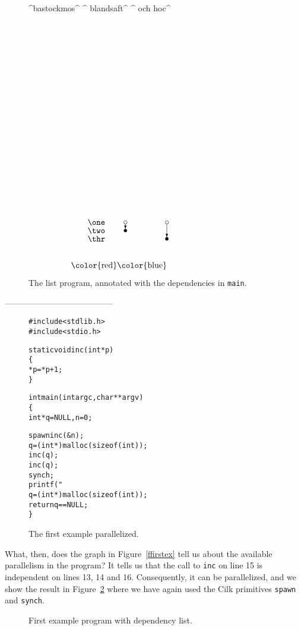 \begin{figure} \small
\hrulefill
\verbdef\one^bastockmos^
\verbdef\two^       blandsaft^
\verbdef\thr^       och hoc^
\[
\begin{picture}(200,300)

\put(20,50){\makebox(100,10)[l]{\one}}
\put(20,40){\makebox(100,10)[l]{\two}}
\put(20,30){\makebox(100,10)[l]{\thr}}
\color{red}
\put(10,53){\vector(0,-1){6}}
\put(10,55){\circle{4}}
\put(10,45){\circle*{4}}
\color{blue}
\put(0,53){\vector(0,-1){16}}
\put(0,55){\circle{4}}
\put(0,35){\circle*{4}}

\end{picture}
\]
\hrulefill
\end{figure}



\begin{figure}
\small
\hrulefill

\hrulefill
\caption{The list program, annotated with the dependencies in {\tt main}.}
\label{flist}
\end{figure}


---------------------------------------

\begin{figure}
\small
\hrulefill
\begin{alltt}
#include <stdlib.h>
#include <stdio.h>

static void inc(int *p)
\verb+{+
   *p=*p+1;
\verb+}+

int main(int argc, char **argv)
\verb+{+
   int *q=NULL,n=0;

   {\color{red}spawn} inc(&n);
   q = (int*) malloc( sizeof(int) );
   inc(q);
   inc(q);
   {\color{red}synch;}
   printf( "%d\verb+\+n", *q+n );
   q = (int*) malloc( sizeof(int) );
   return q==NULL;
\verb+}+
\end{alltt}
\hrulefill
\caption{The first example parallelized.}
\label{fparfirstex}
\end{figure}

What, then, does the graph in Figure~\ref{ffirstex} tell us about
the available parallelism in the program? It tells us that 
the call to {\tt inc} on line 15 is independent on lines 13, 14
and 16. Consequently, it can be parallelized, and we show the
result in Figure~\ref{fparfirstex} where we have again used the 
Cilk primitives {\tt spawn} and {\tt synch}.

\begin{figure} 
\small

\caption{First example program with dependency list.}
\label{ffirstexlist}
\end{figure}

